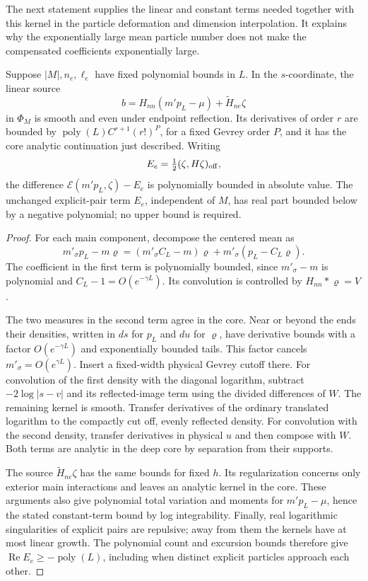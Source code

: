 The next statement supplies the linear and constant terms needed together with this kernel in the particle deformation and dimension interpolation. It explains why the exponentially large mean particle number does not make the compensated coefficients exponentially large.

\begin{lemma}\label{lem:03-source-regularity}
Suppose \(|M|,n_e,\ell_e\) have fixed polynomial bounds in \(L\). In the \(s\)-coordinate, the linear source
\[
 b=H_{nn}(m'p_L-\mu)+\widetilde H_{ne}\zeta
\]
in \(\Phi_M\) is smooth and even under endpoint reflection. Its derivatives of order \(r\) are bounded by
\(\operatorname{poly}(L)C^{r+1}(r!)^P\), for a fixed Gevrey order \(P\), and it has the core analytic continuation just described. Writing
\[
 E_e=\tfrac12(\zeta,H\zeta)_{\rm off},
\]
the difference \(\mathcal E(m'p_L,\zeta)-E_e\) is polynomially bounded in absolute value. The unchanged explicit-pair term \(E_e\), independent of \(M\), has real part bounded below by a negative polynomial; no upper bound is required.
\end{lemma}
\begin{proof}
For each main component, decompose the centered mean as
\[
 m'_\sigma p_L-m\varrho
   =(m'_\sigma C_L-m)\varrho
       +m'_\sigma(p_L-C_L\varrho).
\]
The coefficient in the first term is polynomially bounded, since \(m'_\sigma-m\) is polynomial and \(C_L-1=O(e^{-\gamma L})\). Its convolution is controlled by \(H_{nn}*\varrho=V\).

The two measures in the second term agree in the core. Near or beyond the ends their densities, written in \(ds\) for \(p_L\) and \(du\) for \(\varrho\), have derivative bounds with a factor \(O(e^{-\gamma L})\) and exponentially bounded tails. This factor cancels \(m'_\sigma=O(e^{\gamma L})\). Insert a fixed-width physical Gevrey cutoff there. For convolution of the first density with the diagonal logarithm, subtract \(-2\log|s-v|\) and its reflected-image term using the divided differences of \(W\). The remaining kernel is smooth. Transfer derivatives of the ordinary translated logarithm to the compactly cut off, evenly reflected density. For convolution with the second density, transfer derivatives in physical \(u\) and then compose with \(W\). Both terms are analytic in the deep core by separation from their supports.

The source \(\widetilde H_{ne}\zeta\) has the same bounds for fixed \(h\). Its regularization concerns only exterior main interactions and leaves an analytic kernel in the core. These arguments also give polynomial total variation and moments for \(m'p_L-\mu\), hence the stated constant-term bound by log integrability. Finally, real logarithmic singularities of explicit pairs are repulsive; away from them the kernels have at most linear growth. The polynomial count and excursion bounds therefore give \(\operatorname{Re}E_e\ge-\operatorname{poly}(L)\), including when distinct explicit particles approach each other.
\end{proof}

